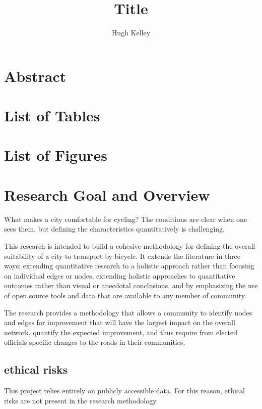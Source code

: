 \documentclass[11pt]{article} %
\title{\vspace{-3.0cm}Title}
\author{Hugh Kelley}
\date{} %
\begin{document}
\maketitle

\section{Abstract}

\section{List of Tables}

\section{List of Figures}


\section{Research Goal and Overview}
What makes a city comfortable for cycling? The conditions are clear when one sees them, but defining the characteristics quantitatively is challenging. 

This research is intended to build a cohesive methodology for defining the overall suitability of a city to transport by bicycle. It extends the literature in three ways; extending quantitative research to a holistic approach rather than focusing on individual edges or nodes, extending holistic approaches to quantitative outcomes rather than visual or anecdotal conclusions, and by emphasizing the use of open source tools and data that are available to any member of community. 

The research provides a methodology that allows a community to identify nodes and edges for improvement that will have the largest impact on the overall network, quantify the expected improvement, and thus require from elected officials specific changes to the roads in their communities. 

\subsection{ethical risks}

This project relies entirely on publicly accessible data. For this reason, ethical risks are not present in the research methodology.  
\end{document}
